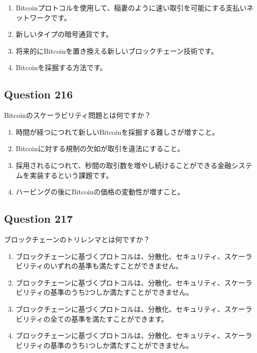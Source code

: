 \documentclass[12pt,a4paper]{article}
\begin{document}
\begin{enumerate}[label=\Alph*., leftmargin=*]
\item Bitcoinプロトコルを使用して、稲妻のように速い取引を可能にする支払いネットワークです。
\item 新しいタイプの暗号通貨です。
\item 将来的にBitcoinを置き換える新しいブロックチェーン技術です。
\item Bitcoinを採掘する方法です。
\end{enumerate}

\bigskip


\subsection*{Question 216}
Bitcoinのスケーラビリティ問題とは何ですか？

\begin{enumerate}[label=\Alph*., leftmargin=*]
\item 時間が経つにつれて新しいBitcoinを採掘する難しさが増すこと。
\item Bitcoinに対する規制の欠如が取引を違法にすること。
\item 採用されるにつれて、秒間の取引数を増やし続けることができる金融システムを実装するという課題です。
\item ハービングの後にBitcoinの価格の変動性が増すこと。
\end{enumerate}

\bigskip


\subsection*{Question 217}
ブロックチェーンのトリレンマとは何ですか？

\begin{enumerate}[label=\Alph*., leftmargin=*]
\item ブロックチェーンに基づくプロトコルは、分散化、セキュリティ、スケーラビリティのいずれの基準も満たすことができません。
\item ブロックチェーンに基づくプロトコルは、分散化、セキュリティ、スケーラビリティの基準のうち2つしか満たすことができません。
\item ブロックチェーンに基づくプロトコルは、分散化、セキュリティ、スケーラビリティの全ての基準を満たすことができます。
\item ブロックチェーンに基づくプロトコルは、分散化、セキュリティ、スケーラビリティの基準のうち1つしか満たすことができません。
\end{enumerate}
\end{document}
